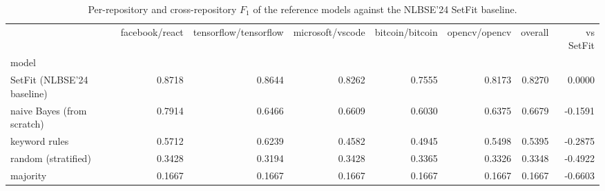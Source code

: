 \begin{table}[htbp]
  \centering
  \caption{Per-repository and cross-repository $F_1$ of the reference models against the NLBSE'24 SetFit baseline.}
  \label{tab:reference-leaderboard}
\begin{tabular}{lrrrrrrr}
\toprule
 & facebook/react & tensorflow/tensorflow & microsoft/vscode & bitcoin/bitcoin & opencv/opencv & overall & vs SetFit \\
model &  &  &  &  &  &  &  \\
\midrule
SetFit (NLBSE'24 baseline) & 0.8718 & 0.8644 & 0.8262 & 0.7555 & 0.8173 & 0.8270 & 0.0000 \\
naive Bayes (from scratch) & 0.7914 & 0.6466 & 0.6609 & 0.6030 & 0.6375 & 0.6679 & -0.1591 \\
keyword rules & 0.5712 & 0.6239 & 0.4582 & 0.4945 & 0.5498 & 0.5395 & -0.2875 \\
random (stratified) & 0.3428 & 0.3194 & 0.3428 & 0.3365 & 0.3326 & 0.3348 & -0.4922 \\
majority & 0.1667 & 0.1667 & 0.1667 & 0.1667 & 0.1667 & 0.1667 & -0.6603 \\
\bottomrule
\end{tabular}
\end{table}
